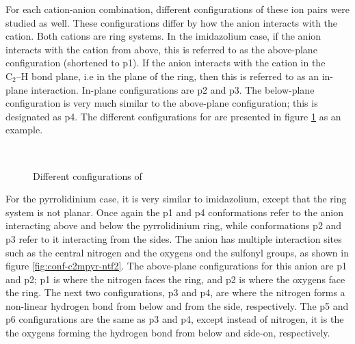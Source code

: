 For each cation-anion combination, different configurations of these ion pairs were studied as well. 
These configurations differ by how the anion interacts with the cation.
Both cations are ring systems. 
In the imidazolium case, if the anion interacts with the cation from above, this is referred to as the above-plane configuration (shortened to p1).
If the anion interacts with the cation in the $\text{C}_2\text{--H}$ bond plane, i.e  in the plane of the ring, then this is referred to as an in-plane interaction.
In-plane configurations are p2 and p3.
The below-plane configuration is very much similar to the above-plane configuration; this is designated as p4.
The different configurations for  are presented in figure
\protect\ref{fig:conf-c3mim-br}
as an example. 

\begin{figure}
    \centering
    \mbox{
    }
    \mbox{
    }                                 
    \caption{Different configurations of \protect{} \label{fig:conf-c3mim-br}}
\end{figure}

For the pyrrolidinium case, it is very similar to imidazolium, except that the ring system is not planar.
Once again the p1 and p4 conformations refer to the anion interacting above and below the pyrrolidinium ring, while conformations p2 and p3 refer to it interacting from the sides.
The \ntf anion has multiple interaction sites such as the central nitrogen and the oxygens ond the sulfonyl groups, as shown in figure
\ref{fig:conf-c2mpyr-ntf2}.
The above-plane configurations for this anion are p1 and p2; p1 is where the nitrogen faces the ring, and p2 is where the oxygens face the ring.
The next two configurations, p3 and p4, are where the nitrogen forms a non-linear hydrogen bond from below and from the side, respectively.
The p5 and p6 configurations are the same as p3 and p4, except instead of nitrogen, it is the the oxygens forming the hydrogen bond from below and side-on, respectively.


